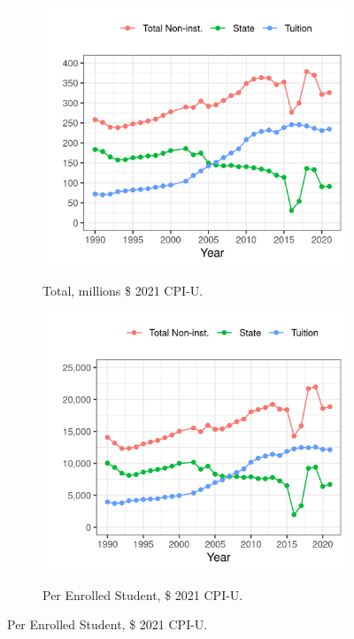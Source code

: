 \documentclass[notitlepage,12pt]{article}
\begin{document}
\begin{figure}[h!]
    \centering
    \caption{Mean Revenues among Illinois Public Universities, by Year.}
    \begin{subfigure}[b]{0.495\textwidth}
        \centering
        \caption{Total, millions \$ 2021 CPI-U.}
        \includegraphics[width=\textwidth]{figures/illinois-funding-total.png}
        \label{fig:illinois-funding-total}
    \end{subfigure}
    \begin{subfigure}[b]{0.495\textwidth}
        \centering
        \caption{Per Enrolled Student, \$ 2021 CPI-U.}
        \includegraphics[width=\textwidth]{figures/illinois-funding-fte.png}
        \label{fig:illinois-funding-fte}
    \end{subfigure}
    \label{fig:illinois-funding}
\end{figure}
\end{document}
